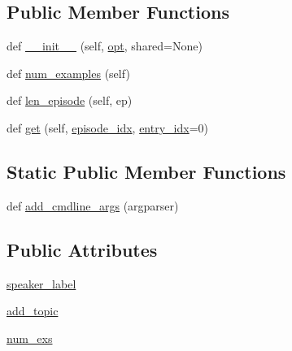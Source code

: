 \subsection*{Public Member Functions}
\begin{DoxyCompactItemize}
\item 
def \hyperlink{classparlai_1_1tasks_1_1wizard__of__wikipedia_1_1agents_1_1BasicdialogTeacher_a15a3b192484500d616eeac7bcd871cc2}{\+\_\+\+\_\+init\+\_\+\+\_\+} (self, \hyperlink{classparlai_1_1tasks_1_1wizard__of__wikipedia_1_1agents_1_1WizardOfWikipediaTeacher_a5d97ef38a8c6e7df29724122f5b9ff72}{opt}, shared=None)
\item 
def \hyperlink{classparlai_1_1tasks_1_1wizard__of__wikipedia_1_1agents_1_1BasicdialogTeacher_ac740a641709550f191b2c48adfb14a13}{num\+\_\+examples} (self)
\item 
def \hyperlink{classparlai_1_1tasks_1_1wizard__of__wikipedia_1_1agents_1_1BasicdialogTeacher_a2557378cd9519f4596b2fcc713698056}{len\+\_\+episode} (self, ep)
\item 
def \hyperlink{classparlai_1_1tasks_1_1wizard__of__wikipedia_1_1agents_1_1BasicdialogTeacher_ae457e3f6ba55bc18191d0fbcc4b408a1}{get} (self, \hyperlink{classparlai_1_1core_1_1teachers_1_1FixedDialogTeacher_afd4ebab8063eb42d182d30a1a41f133e}{episode\+\_\+idx}, \hyperlink{classparlai_1_1core_1_1teachers_1_1FixedDialogTeacher_ae3201b15f3c3b46a2f3511bad9b43e7d}{entry\+\_\+idx}=0)
\end{DoxyCompactItemize}
\subsection*{Static Public Member Functions}
\begin{DoxyCompactItemize}
\item 
def \hyperlink{classparlai_1_1tasks_1_1wizard__of__wikipedia_1_1agents_1_1BasicdialogTeacher_a05990443efe8ab6f6361cbea39d50dca}{add\+\_\+cmdline\+\_\+args} (argparser)
\end{DoxyCompactItemize}
\subsection*{Public Attributes}
\begin{DoxyCompactItemize}
\item 
\hyperlink{classparlai_1_1tasks_1_1wizard__of__wikipedia_1_1agents_1_1BasicdialogTeacher_aacc71f8c41cd2a67481e19e2d7bcdd6e}{speaker\+\_\+label}
\item 
\hyperlink{classparlai_1_1tasks_1_1wizard__of__wikipedia_1_1agents_1_1BasicdialogTeacher_a9eaad000a7aac1f96b497916d0cd6126}{add\+\_\+topic}
\item 
\hyperlink{classparlai_1_1tasks_1_1wizard__of__wikipedia_1_1agents_1_1BasicdialogTeacher_ab4f662982ef3d074d3d813f53d300ca4}{num\+\_\+exs}
\end{DoxyCompactItemize}


